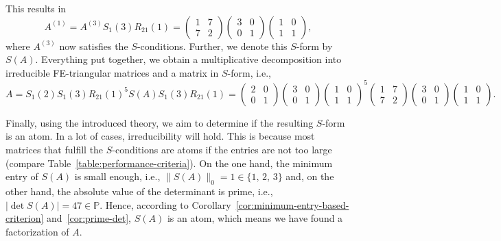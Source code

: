 \begin{example}
This results in 
\[ A^{(1)} = A^{(3)}S_1(3)R_{21}(1) = \begin{pmatrix} 1 & 7 \\ 7 & 2 \end{pmatrix}\begin{pmatrix} 3 & 0 \\ 0 & 1 \end{pmatrix}\begin{pmatrix} 1 & 0 \\ 1 & 1 \end{pmatrix}, \]
where $A^{(3)}$ now satisfies the $S$-conditions. Further, we denote this $S$-form by $S(A)$.
Everything put together, we obtain a multiplicative decomposition into irreducible FE-triangular matrices and a matrix in $S$-form, i.e.,
\[ A= S_1(2)S_1(3)R_{21}(1)^5S(A)S_1(3)R_{21}(1) =\begin{pmatrix} 2 & 0 \\ 0 & 1 \end{pmatrix}\begin{pmatrix} 3 & 0 \\ 0 & 1 \end{pmatrix}\begin{pmatrix} 1 & 0 \\ 1 & 1 \end{pmatrix}^5 \begin{pmatrix} 1 & 7 \\ 7 & 2 \end{pmatrix}\begin{pmatrix} 3 & 0 \\ 0 & 1 \end{pmatrix}\begin{pmatrix} 1 & 0 \\ 1 & 1 \end{pmatrix}.\]

Finally, using the introduced theory, we aim to determine if the resulting $S$-form is an atom. In a lot of cases, irreducibility will hold. This is because most matrices that fulfill the $S$-conditions are atoms if the entries are not too large (compare Table~\ref{table:performance-criteria}). On the one hand, the minimum entry of $S(A)$ is small enough, i.e., $\|S(A) \|_0 = 1 \in \{ 1,\, 2,\, 3 \}$ and, on the other hand, the absolute value of the determinant is prime, i.e., $|\det{S(A)}| = 47 \in \mathbb{P}$. Hence, according to Corollary~\ref{cor:minimum-entry-based-criterion} and~\ref{cor:prime-det}, $S(A)$ is an atom, which means we have found a factorization of $A$.
\end{example}

